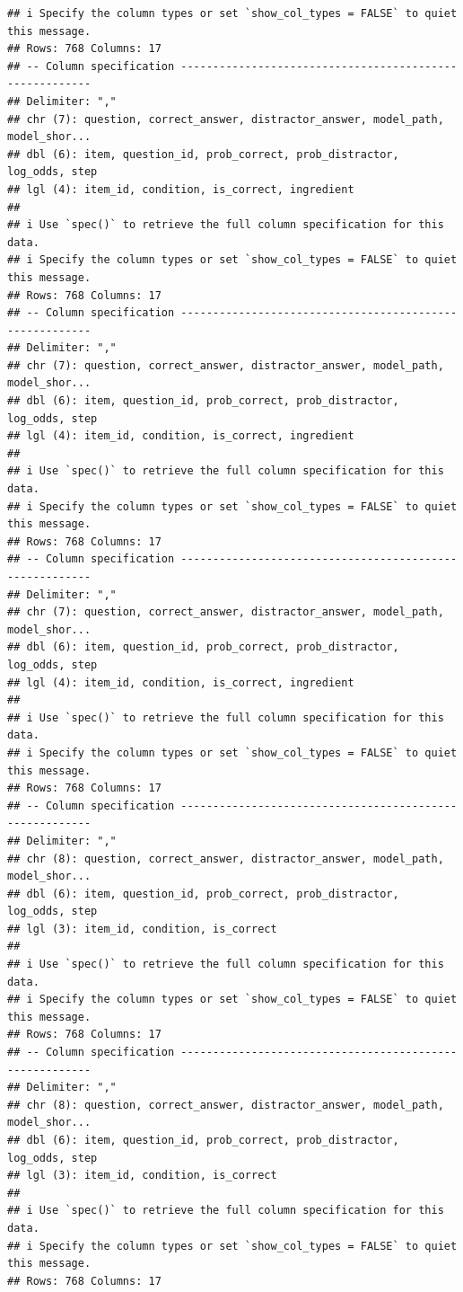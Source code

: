 \documentclass[
]{article}
\begin{document}
\begin{verbatim}
## i Specify the column types or set `show_col_types = FALSE` to quiet this message.
## Rows: 768 Columns: 17
## -- Column specification --------------------------------------------------------
## Delimiter: ","
## chr (7): question, correct_answer, distractor_answer, model_path, model_shor...
## dbl (6): item, question_id, prob_correct, prob_distractor, log_odds, step
## lgl (4): item_id, condition, is_correct, ingredient
## 
## i Use `spec()` to retrieve the full column specification for this data.
## i Specify the column types or set `show_col_types = FALSE` to quiet this message.
## Rows: 768 Columns: 17
## -- Column specification --------------------------------------------------------
## Delimiter: ","
## chr (7): question, correct_answer, distractor_answer, model_path, model_shor...
## dbl (6): item, question_id, prob_correct, prob_distractor, log_odds, step
## lgl (4): item_id, condition, is_correct, ingredient
## 
## i Use `spec()` to retrieve the full column specification for this data.
## i Specify the column types or set `show_col_types = FALSE` to quiet this message.
## Rows: 768 Columns: 17
## -- Column specification --------------------------------------------------------
## Delimiter: ","
## chr (7): question, correct_answer, distractor_answer, model_path, model_shor...
## dbl (6): item, question_id, prob_correct, prob_distractor, log_odds, step
## lgl (4): item_id, condition, is_correct, ingredient
## 
## i Use `spec()` to retrieve the full column specification for this data.
## i Specify the column types or set `show_col_types = FALSE` to quiet this message.
## Rows: 768 Columns: 17
## -- Column specification --------------------------------------------------------
## Delimiter: ","
## chr (8): question, correct_answer, distractor_answer, model_path, model_shor...
## dbl (6): item, question_id, prob_correct, prob_distractor, log_odds, step
## lgl (3): item_id, condition, is_correct
## 
## i Use `spec()` to retrieve the full column specification for this data.
## i Specify the column types or set `show_col_types = FALSE` to quiet this message.
## Rows: 768 Columns: 17
## -- Column specification --------------------------------------------------------
## Delimiter: ","
## chr (8): question, correct_answer, distractor_answer, model_path, model_shor...
## dbl (6): item, question_id, prob_correct, prob_distractor, log_odds, step
## lgl (3): item_id, condition, is_correct
## 
## i Use `spec()` to retrieve the full column specification for this data.
## i Specify the column types or set `show_col_types = FALSE` to quiet this message.
## Rows: 768 Columns: 17

\end{verbatim}
\end{document}
